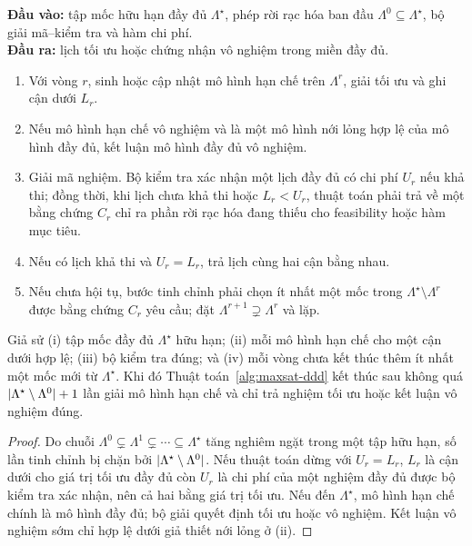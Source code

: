 \begin{algorithm}[H]
\caption{Vòng lặp MaxSAT--DDD có kiểm chứng}
\label{alg:maxsat-ddd}
\begin{minipage}{.94\textwidth}\small
\textbf{Đầu vào:} tập mốc hữu hạn đầy đủ \(\Lambda^\star\), phép rời rạc hóa ban đầu
\(\Lambda^0\subseteq\Lambda^\star\), bộ giải mã–kiểm tra và hàm chi phí.\\
\textbf{Đầu ra:} lịch tối ưu hoặc chứng nhận vô nghiệm trong miền đầy đủ.
\begin{enumerate}
  \item Với vòng \(r\), sinh hoặc cập nhật mô hình hạn chế trên
  \(\Lambda^r\), giải tối ưu và ghi cận dưới \(L_r\).
  \item Nếu mô hình hạn chế vô nghiệm và là một mô hình nới lỏng hợp lệ của mô hình
  đầy đủ, kết luận mô hình đầy đủ vô nghiệm.
  \item Giải mã nghiệm. Bộ kiểm tra xác nhận một lịch đầy đủ có chi phí \(U_r\) nếu
  khả thi; đồng thời, khi lịch chưa khả thi hoặc \(L_r<U_r\), thuật toán phải trả về một
  bằng chứng \(C_r\) chỉ ra phần rời rạc hóa đang thiếu cho feasibility hoặc
  hàm mục tiêu.
  \item Nếu có lịch khả thi và \(U_r=L_r\), trả lịch cùng hai cận bằng nhau.
  \item Nếu chưa hội tụ, bước tinh chỉnh phải chọn ít nhất một mốc trong
  \(\Lambda^\star\setminus\Lambda^r\) được bằng chứng \(C_r\) yêu cầu; đặt
  \(\Lambda^{r+1}\supsetneq\Lambda^r\) và lặp.
\end{enumerate}
\end{minipage}
\end{algorithm}

\begin{proposition}
\label{prop:ddd-finite}
Giả sử (i) tập mốc đầy đủ \(\Lambda^\star\) hữu hạn; (ii) mỗi mô hình hạn chế
cho một cận dưới hợp lệ; (iii) bộ kiểm tra đúng; và (iv) mỗi vòng chưa kết thúc
thêm ít nhất một mốc mới từ \(\Lambda^\star\). Khi đó
Thuật toán~\ref{alg:maxsat-ddd} kết thúc sau không quá
\(\lvert \Lambda^\star\setminus\Lambda^0\rvert+1\) lần giải mô hình hạn chế và chỉ
trả nghiệm tối ưu hoặc kết luận vô nghiệm đúng.
\end{proposition}

\begin{proof}
Do chuỗi
\(\Lambda^0\subsetneq\Lambda^1\subsetneq\cdots\subseteq\Lambda^\star\)
tăng nghiêm ngặt trong một tập hữu hạn, số lần tinh chỉnh bị chặn bởi
\(\lvert \Lambda^\star\setminus\Lambda^0\rvert\). Nếu thuật toán dừng với
\(U_r=L_r\), \(L_r\) là cận dưới cho giá trị tối ưu đầy đủ còn \(U_r\) là chi
phí của một nghiệm đầy đủ được bộ kiểm tra xác nhận, nên cả hai bằng giá trị
tối ưu. Nếu đến \(\Lambda^\star\), mô hình hạn chế chính là mô hình đầy đủ; bộ giải quyết định
tối ưu hoặc vô nghiệm. Kết luận vô nghiệm sớm chỉ hợp lệ dưới giả thiết
nới lỏng ở (ii).
\end{proof}

